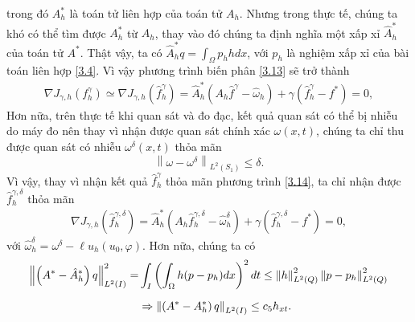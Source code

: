 \documentclass[]{article}
\begin{document}
trong đó $A_h^*$ là toán tử liên hợp của toán tử $A_h$. Nhưng trong thực tế, chúng ta khó có thể tìm được $A^*_h$ từ $A_h$, thay vào đó chúng ta định nghĩa một xấp xỉ $\hat{A}_h^*$ của toán tử $A^*$. Thật vậy, ta có $\hat{A}^*_hq=\int_\Omega p_hhdx$, với $p_h$ là nghiệm xấp xỉ của bài toán liên hợp \eqref{3.4}. Vì vậy phương trình biến phân \eqref{3.13} sẽ trở thành
\begin{align}\label{3.14}
\nabla J_{\gamma, h}(f^\gamma_h)\simeq\nabla J_{\gamma, h}(\hat{f}^\gamma_h)= \hat{A}_h^*(A_h\hat{f}^\gamma-\hat{\omega}_h)+\gamma(\hat{f}^\gamma_h-f^*)=0,
\end{align}
Hơn nữa, trên thực tế khi quan sát và đo đạc, kết quả quan sát có thể bị nhiễu do máy đo nên thay vì nhận được quan sát chính xác $\omega(x, t)$, chúng ta chỉ thu được quan sát có nhiễu $\omega^{\delta}(x, t)$ thỏa mãn
$$\left\| \omega-\omega^\delta\right\|_{L^2(S_1)}\leq \delta.$$
Vì vậy, thay vì nhận kết quả $\hat{f}^\gamma_h$ thỏa mãn phương trình \eqref{3.14}, ta chỉ nhận được $\hat{f}^{\gamma, \delta}_h$ thỏa mãn
\begin{align}\label{3.15}
\nabla J_{\gamma, h}\left(\hat{f}^{\gamma, \delta}_h\right)= \hat{A}_h^*(A_h\hat{f}^{\gamma, \delta}_h-\hat{\omega}_h^\delta)+\gamma(\hat{f}^{\gamma, \delta}_h-f^*)=0,
\end{align}
với $\hat{\omega}_h^\delta=\omega^\delta-\ell u_h(u_0, \varphi)$.
Hơn nữa, chúng ta có
\begin{align}
\left\| \left(A^*-\hat{A}^*_h\right)q\right\|_{L^2(I)}^2=&\int_I\left(\int_\Omega h(p-p_h)dx\right)^2dt\leq \left\| h\right\|_{L^2(Q)}^2\left\| p-p_h\right\|_{L^2(Q)}^2\notag\\[0.2cm]
&\Rightarrow \left\| \left(A^*-A^*_h\right)q\right\|_{L^2(I)}\leq c_5h_{xt}.\label{3.16}
\end{align}
\end{document}
